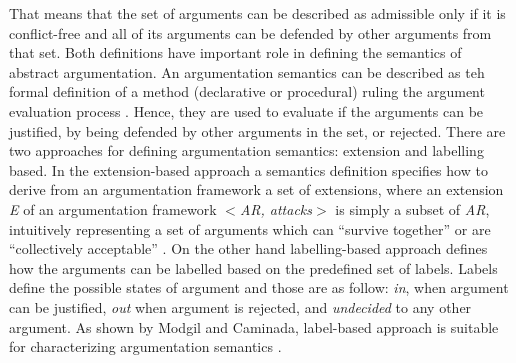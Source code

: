 That means that the set of arguments can be described as admissible only if it is conflict-free and all of its arguments can be defended by other arguments from that set. Both definitions have important role in defining the semantics of abstract argumentation. An argumentation semantics can be described as teh formal definition of a method (declarative or procedural) ruling the argument evaluation process \citep{baroni2009semantics}. Hence, they are used to evaluate if the arguments can be justified, by being defended by other arguments in the set, or rejected. There are two approaches for defining argumentation semantics: extension and labelling based. In the extension-based approach a semantics definition specifies how to derive from an argumentation framework a set of extensions, where an extension \textit{E} of an argumentation framework $<$\textit{AR, attacks}$>$ is simply a subset of \textit{AR}, intuitively representing a set of arguments which can “survive together” or are “collectively acceptable” \citep{baroni2009semantics}. On the other hand labelling-based approach defines how the arguments can be labelled based on the predefined set of labels. Labels define the possible states of argument and those are as follow: \textit{in}, when argument can be justified, \textit{out} when argument is rejected, and \textit{undecided} to any other argument. As shown by Modgil and Caminada, label-based approach is suitable for characterizing argumentation semantics \citep{modgil2009proof}.